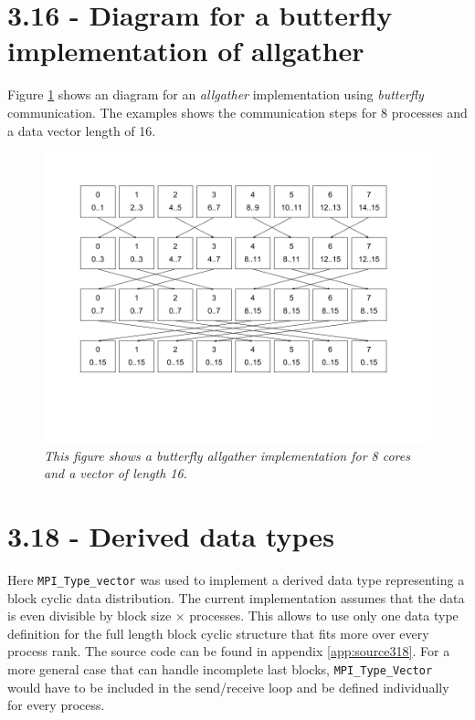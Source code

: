 \documentclass[a4paper,11pt,twoside]{article}
\begin{document}
\section{3.16 - Diagram for a butterfly implementation of allgather}
Figure \ref{fig:allgather} shows an diagram for an \textit{allgather} implementation using \textit{butterfly} communication. The examples shows the communication steps for 8 processes and a data vector length of 16.  
\begin{figure}
  \centering
    \includegraphics[width=1\textwidth]{allgather.png}
    \caption{\textit{This figure shows a butterfly allgather implementation for 8 cores and a vector of length 16.}}
    \label{fig:allgather}
\end{figure}



\section{3.18 - Derived data types}
Here \verb+MPI_Type_vector+ was used to implement a derived data type representing a block cyclic data distribution. The current implementation assumes that the data is even divisible by block size $\times$ processes. This allows to use only one data type definition for the full length block cyclic structure that fits more over every process rank. The source code can be found in appendix \ref{app:source318}. For a more general case that can handle incomplete last blocks, \verb+MPI_Type_Vector+ would have to be included in the send/receive loop and be defined individually for every process.
\end{document}
